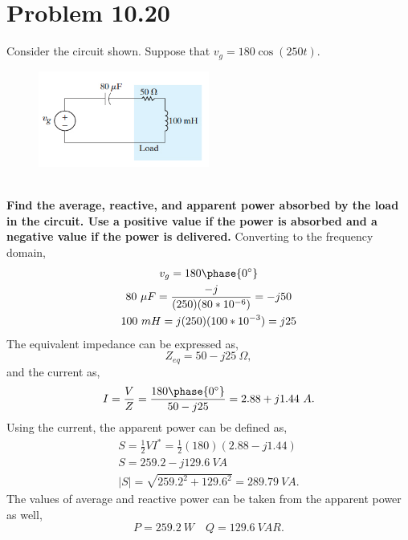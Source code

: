 \documentclass[12pt]{article}
\begin{document}
    \section*{Problem 10.20}
    Consider the circuit shown. Suppose that $v_{g} = 180 \cos (250 t)$.
    \begin{figure}[h]
        \centering
        \includegraphics[width=0.5\textwidth]{10.20 Circuit.png}
    \end{figure} \\
    \textbf{Find the average, reactive, and apparent power absorbed by the load
    in the circuit. Use a positive value if the power is absorbed and a negative
    value if the power is delivered.}
    \newpage
    \noindent Converting to the frequency domain,
    \begin{gather*}
        v_{g} = 180 \phase{0^{\circ}} \\
        80\ \mu F = \frac{-j}{(250)(80*10^{-6})} = -j 50 \\
        100\ mH = j (250) (100*10^{-3}) = j 25
    \end{gather*}
    The equivalent impedance can be expressed as,
    \[
        Z_{eq} = 50 - j 25\ \Omega
    ,\]
    and the current as,
    \[
        I = \frac{V}{Z} = \frac{180 \phase{0^{\circ}}}{50 - j 25} = 2.88 + j
        1.44\ A
    .\]
    Using the current, the apparent power can be defined as,
    \begin{gather*}
        S = \frac{1}{2} VI^{*} = \frac{1}{2} (180)(2.88 - j 1.44) \\
        S = 259.2 - j 129.6\ VA \\
        |S| = \sqrt{259.2^2 + 129.6^2} = \boxed{289.79\ VA.}
    \end{gather*}
    The values of average and reactive power can be taken from the apparent
    power as well,
    \[
        \boxed{P = 259.2\ W \quad Q = 129.6\ VAR}
    .\]
\end{document}

